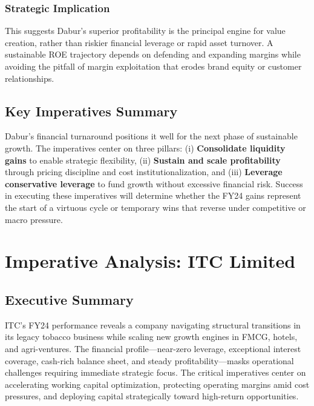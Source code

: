 \documentclass[12pt, a4paper]{report}
\begin{document}
\subsubsection{Strategic Implication}
This suggests Dabur's superior profitability is the principal engine for value creation, rather than riskier financial leverage or rapid asset turnover. A sustainable ROE trajectory depends on defending and expanding margins while avoiding the pitfall of margin exploitation that erodes brand equity or customer relationships.

\subsection{Key Imperatives Summary}

Dabur's financial turnaround positions it well for the next phase of sustainable growth. The imperatives center on three pillars: (i) \textbf{Consolidate liquidity gains} to enable strategic flexibility, (ii) \textbf{Sustain and scale profitability} through pricing discipline and cost institutionalization, and (iii) \textbf{Leverage conservative leverage} to fund growth without excessive financial risk. Success in executing these imperatives will determine whether the FY24 gains represent the start of a virtuous cycle or temporary wins that reverse under competitive or macro pressure.

\newpage


\section{Imperative Analysis: ITC Limited}

\subsection{Executive Summary}

ITC's FY24 performance reveals a company navigating structural transitions in its legacy tobacco business while scaling new growth engines in FMCG, hotels, and agri-ventures. The financial profile—near-zero leverage, exceptional interest coverage, cash-rich balance sheet, and steady profitability—masks operational challenges requiring immediate strategic focus. The critical imperatives center on accelerating working capital optimization, protecting operating margins amid cost pressures, and deploying capital strategically toward high-return opportunities.
\end{document}
